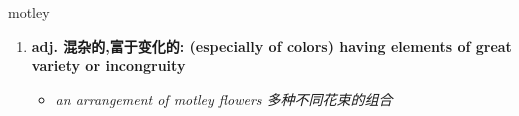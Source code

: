 
\begin{frame}
{\huge motley}
\begin{center}
\begin{enumerate}\Large
  \item \textbf{adj. 混杂的,富于变化的: (especially of colors) having elements of great variety or incongruity}
  \begin{itemize}
    \item \em{\Large{an arrangement of motley flowers 多种不同花束的组合}}
  \end{itemize}
\end{enumerate}
\end{center}
\end{frame}
